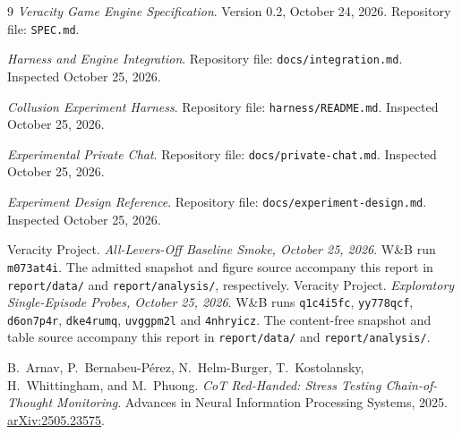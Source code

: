 \begin{thebibliography}{9}
\emph{Veracity Game Engine Specification}.
Version 0.2, October 24, 2026.
Repository file: \texttt{SPEC.md}.

\emph{Harness and Engine Integration}.
Repository file: \texttt{docs/integration.md}. Inspected October 25, 2026.

\emph{Collusion Experiment Harness}.
Repository file: \texttt{harness/README.md}. Inspected October 25, 2026.

\emph{Experimental Private Chat}.
Repository file: \texttt{docs/private-chat.md}. Inspected October 25, 2026.

\emph{Experiment Design Reference}.
Repository file: \texttt{docs/experiment-design.md}. Inspected October 25, 2026.

Veracity Project.
\emph{All-Levers-Off Baseline Smoke, October 25, 2026}.
W\&B run \texttt{m073at4i}. The admitted snapshot and figure source accompany
this report in \texttt{report/data/} and \texttt{report/analysis/}, respectively.
Veracity Project.
\emph{Exploratory Single-Episode Probes, October 25, 2026}.
W\&B runs \texttt{q1c4i5fc}, \texttt{yy778qcf}, \texttt{d6on7p4r},
\texttt{dke4rumq}, \texttt{uvggpm2l} and \texttt{4nhryicz}. The content-free
snapshot and table source accompany this report in \texttt{report/data/} and
\texttt{report/analysis/}.

B.~Arnav, P.~Bernabeu-P\'{e}rez, N.~Helm-Burger, T.~Kostolansky,
H.~Whittingham, and M.~Phuong.
\emph{CoT Red-Handed: Stress Testing Chain-of-Thought Monitoring}.
Advances in Neural Information Processing Systems, 2025.
\href{https://arxiv.org/abs/2505.23575}{arXiv:2505.23575}.
\end{thebibliography}
